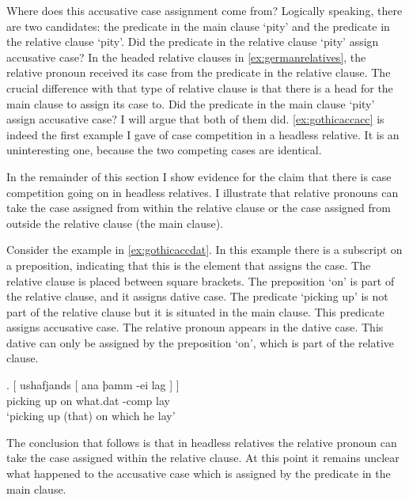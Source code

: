 Where does this accusative case assignment come from? Logically speaking, there are two candidates: the predicate in the main clause  `pity' and the predicate in the relative clause  `pity'. Did the predicate in the relative clause  `pity' assign accusative case? In the headed relative clauses in \ref{ex:germanrelatives}, the relative pronoun received its case from the predicate in the relative clause. The crucial difference with that type of relative clause is that there is a head for the main clause to assign its case to. Did the predicate in the main clause  `pity' assign accusative case? I will argue that both of them did. \ref{ex:gothicaccacc} is indeed the first example I gave of case competition in a headless relative. It is an uninteresting one, because the two competing cases are identical.

In the remainder of this section I show evidence for the claim that there is case competition going on in headless relatives. I illustrate that relative pronouns can take the case assigned from within the relative clause or the case assigned from outside the relative clause (the main clause).

Consider the example in \ref{ex:gothicaccdat}. In this example there is a subscript on a preposition, indicating that this is the element that assigns the case. The relative clause is placed between square brackets. The preposition  `on' is part of the relative clause, and it assigns dative case. The predicate  `picking up' is not part of the relative clause but it is situated in the main clause. This predicate assigns accusative case. The relative pronoun  appears in the dative case. This dative can only be assigned by the preposition  `on', which is part of the relative clause.

\exg. [ ushafjands [ ana þamm -ei lag ] ]\\
 \phantom{x} {picking up} \phantom{x} on what.\ac{dat} -\ac{comp} lay \scsub{[dat]} \scsub{[acc]}\\
 `picking up (that) on which he lay' \label{ex:gothicaccdat}

The conclusion that follows is that in headless relatives the relative pronoun can take the case assigned within the relative clause. At this point it remains unclear what happened to the accusative case which is assigned by the predicate in the main clause.

